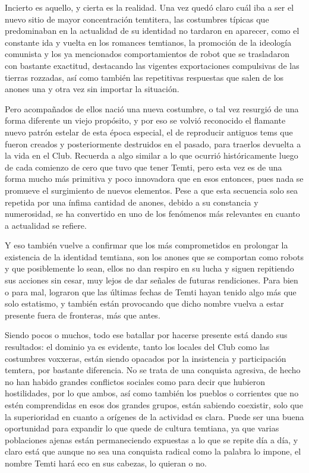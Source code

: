 \documentclass[
  spanish,
]{book}
\begin{document}
Incierto es aquello, y cierta es la realidad. Una vez quedó claro cuál iba a ser el nuevo sitio de mayor concentración temtitera, las costumbres típicas que predominaban en la actualidad de su identidad no tardaron en aparecer, como el constante ida y vuelta en los romances temtianos, la promoción de la ideología comunista y los ya mencionados comportamientos de robot que se trasladaron con bastante exactitud, destacando las vigentes exportaciones compulsivas de las tierras rozzadas, así como también las repetitivas respuestas que salen de los anones una y otra vez sin importar la situación.

Pero acompañados de ellos nació una nueva costumbre, o tal vez resurgió de una forma diferente un viejo propósito, y por eso se volvió reconocido el flamante nuevo patrón estelar de esta época especial, el de reproducir antiguos tems que fueron creados y posteriormente destruidos en el pasado, para traerlos devuelta a la vida en el Club. Recuerda a algo similar a lo que ocurrió históricamente luego de cada comienzo de cero que tuvo que tener Temti, pero esta vez es de una forma mucho más primitiva y poco innovadora que en esos entonces, pues nada se promueve el surgimiento de nuevos elementos. Pese a que esta secuencia solo sea repetida por una ínfima cantidad de anones, debido a su constancia y numerosidad, se ha convertido en uno de los fenómenos más relevantes en cuanto a actualidad se refiere.

Y eso también vuelve a confirmar que los más comprometidos en prolongar la existencia de la identidad temtiana, son los anones que se comportan como robots y que posiblemente lo sean, ellos no dan respiro en su lucha y siguen repitiendo sus acciones sin cesar, muy lejos de dar señales de futuras rendiciones. Para bien o para mal, lograron que las últimas fechas de Temti hayan tenido algo más que solo estatismo, y también están provocando que dicho nombre vuelva a estar presente fuera de fronteras, más que antes.

Siendo pocos o muchos, todo ese batallar por hacerse presente está dando sus resultados: el dominio ya es evidente, tanto los locales del Club como las costumbres voxxeras, están siendo opacados por la insistencia y participación temtera, por bastante diferencia. No se trata de una conquista agresiva, de hecho no han habido grandes conflictos sociales como para decir que hubieron hostilidades, por lo que ambos, así como también los pueblos o corrientes que no estén comprendidas en esos dos grandes grupos, están sabiendo coexistir, solo que la superioridad en cuanto a orígenes de la actividad es clara. Puede ser una buena oportunidad para expandir lo que quede de cultura temtiana, ya que varias poblaciones ajenas están permaneciendo expuestas a lo que se repite día a día, y claro está que aunque no sea una conquista radical como la palabra lo impone, el nombre Temti hará eco en sus cabezas, lo quieran o no.
\end{document}
